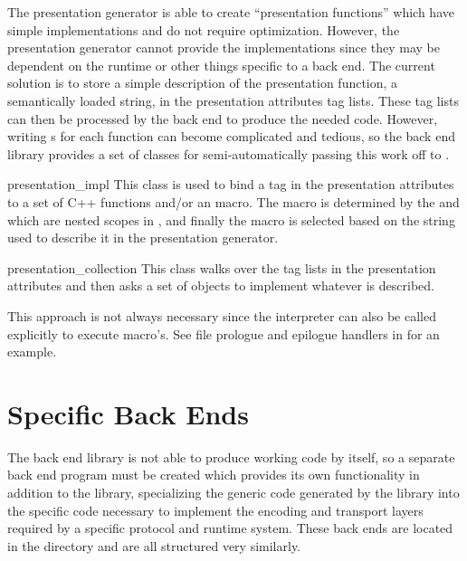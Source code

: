The presentation generator is able to create ``presentation functions'' which
have simple implementations and do not require optimization.  However, the
presentation generator cannot provide the implementations since they may be
dependent on the runtime or other things specific to a back end.  The current
solution is to store a simple description of the presentation function, a
semantically loaded string, in the presentation attributes tag lists.  These
tag lists can then be processed by the back end to produce the needed code.
However, writing s for each function can become complicated
and tedious, so the back end library provides a set of classes for
semi-automatically passing this work off to \SCML{}.

\begin{ctypelist}
  \item[presentation_impl] This class is used to bind a tag in the
  presentation attributes to a set of C++ functions and/or an \SCML{} macro.
  The \SCML{} macro is determined by the  and
   which are nested scopes in \SCML{}, and finally the
  macro is selected based on the string used to describe it in the presentation
  generator.

  \item[presentation_collection] This class walks over the tag lists in
  the presentation attributes and then asks a set of 
  objects to implement whatever is described.
\end{ctypelist}

This approach is not always necessary since the \SCML{} interpreter can also be
called explicitly to execute macro's.  See file prologue and epilogue handlers
in  for an example.



\section{Specific Back Ends}
\label{sec:BE:Specific Back Ends}

The back end library is not able to produce working code by itself, so a
separate back end program must be created which provides its own functionality
in addition to the library, specializing the generic code generated by the
library into the specific code necessary to implement the encoding and
transport layers required by a specific protocol and runtime system.  These
back ends are located in the  directory and are all structured
very similarly.


